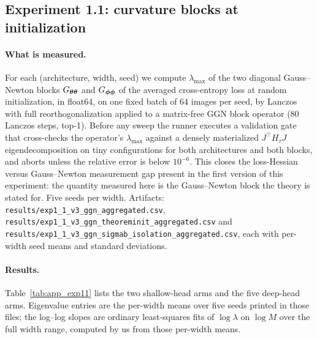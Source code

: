 \subsection{Experiment 1.1: curvature blocks at initialization}
\label{app:exp11}

\paragraph{What is measured.} For each (architecture, width, seed) we compute
$\lambda_{\max}$ of the two diagonal Gauss--Newton blocks $G_{{\boldsymbol{\theta}}{\boldsymbol{\theta}}}$
and $G_{{\boldsymbol{\phi}}{\boldsymbol{\phi}}}$ of the averaged cross-entropy loss at random
initialization, in float64, on one fixed batch of 64 images per seed, by
Lanczos with full reorthogonalization applied to a matrix-free GGN block
operator ($80$ Lanczos steps, top-1). Before any sweep the runner executes a
validation gate that cross-checks the operator's $\lambda_{\max}$ against a
densely materialized $J^\top H_\tau J$ eigendecomposition on tiny
configurations for both architectures and both blocks, and aborts unless the
relative error is below $10^{-6}$. This closes the loss-Hessian versus
Gauss--Newton measurement gap present in the first version of this experiment:
the quantity measured here is the Gauss--Newton block the theory is stated for.
Five seeds per width. Artifacts:
\texttt{results/exp1\_1\_v3\_ggn\_aggregated.csv},
\texttt{results/exp1\_1\_v3\_ggn\_theoreminit\_aggregated.csv} and
\texttt{results/exp1\_1\_v3\_ggn\_sigmab\_isolation\_aggregated.csv}, each with
per-width seed means and standard deviations.

\paragraph{Results.} Table~\ref{tab:app_exp11} lists the two shallow-head arms
and the five deep-head arms. Eigenvalue entries are the per-width means over
five seeds printed in those files; the log--log slopes are ordinary
least-squares fits of $\log \lambda$ on $\log M$ over the full width range,
computed by us from those per-width means.

